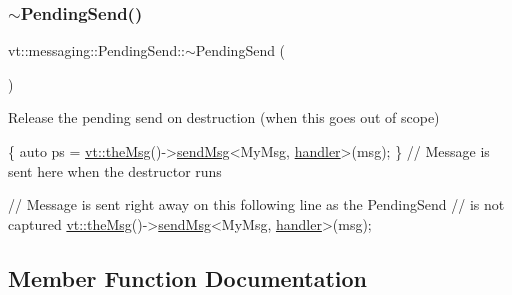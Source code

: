 \mbox{\label{structvt_1_1messaging_1_1_pending_send_ade803ff2903a92eaf62b6e330593871b}} 
\subsubsection{\texorpdfstring{$\sim$\+Pending\+Send()}{~PendingSend()}}
{\footnotesize\ttfamily vt\+::messaging\+::\+Pending\+Send\+::$\sim$\+Pending\+Send (\begin{DoxyParamCaption}{ }\end{DoxyParamCaption})\hspace{0.3cm}{\ttfamily [inline]}}



Release the pending send on destruction (when this goes out of scope) 


\begin{DoxyCode}
\{
  \textcolor{keyword}{auto} ps = \hyperlink{namespacevt_aeafd31f866aeb4dc6fc2f6ee97136350}{vt::theMsg}()->\hyperlink{group__preregister_gaebfcd932babb3be0ea8d481f655a2835}{sendMsg}<MyMsg, \hyperlink{namespacevt_1_1config_a6bd1d6215bda0d8ca02811798399f689a82a0081a94d5c5dfd18b0b3f7eca64b7}{handler}>(msg);
\} \textcolor{comment}{// Message is sent here when the destructor runs}

\textcolor{comment}{// Message is sent right away on this following line as the PendingSend}
\textcolor{comment}{// is not captured}
\hyperlink{namespacevt_aeafd31f866aeb4dc6fc2f6ee97136350}{vt::theMsg}()->\hyperlink{group__preregister_gaebfcd932babb3be0ea8d481f655a2835}{sendMsg}<MyMsg, \hyperlink{namespacevt_1_1config_a6bd1d6215bda0d8ca02811798399f689a82a0081a94d5c5dfd18b0b3f7eca64b7}{handler}>(msg);
\end{DoxyCode}
 

\subsection{Member Function Documentation}
\mbox{\label{structvt_1_1messaging_1_1_pending_send_a0f249a127a798ba0823fae82c925ed3b}} 
